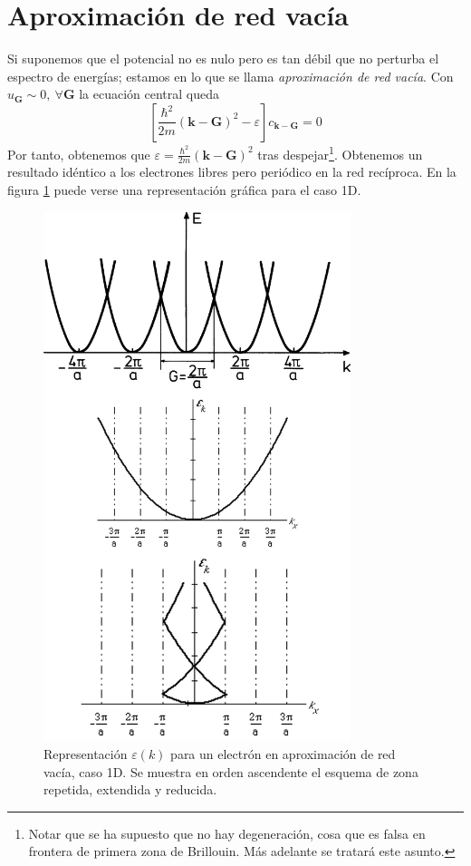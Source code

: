 \section{Aproximación de red vacía}
Si suponemos que el potencial no es nulo pero es tan débil que no perturba el
espectro de energías; estamos en lo que se llama \emph{aproximación de
red vacía}. Con $u_\mathbf{G}\sim 0, \ \forall \mathbf{G}$ la ecuación
central queda
\begin{equation}
  \left[ \frac{\hbar^2}{2m}(\mathbf{k}-\mathbf{G})^2 - \varepsilon
  \right] c_{\mathbf{k}-\mathbf{G}} = 0
\end{equation}
Por tanto, obtenemos que  $\varepsilon =
\frac{\hbar^2}{2m}(\mathbf{k}-\mathbf{G})^2$ tras
despejar\footnote{Notar que se ha supuesto que no hay degeneración,
  cosa que es falsa en frontera de primera zona de Brillouin. Más
  adelante se tratará este asunto.}. Obtenemos un resultado
idéntico a los electrones libres pero periódico en la red recíproca.
En la figura \ref{fig:emptylattice} puede verse una representación
gráfica para el caso 1D.
\begin{figure}
  \centering
  \includegraphics[width=0.8\textwidth]{figures/emptylatticeap.png}
  \caption{Representación $\varepsilon(k)$ para un
    electrón en aproximación de red vacía, caso 1D. Se muestra en
    orden ascendente el esquema de zona repetida, extendida y reducida.}
  \label{fig:emptylattice}
\end{figure}

